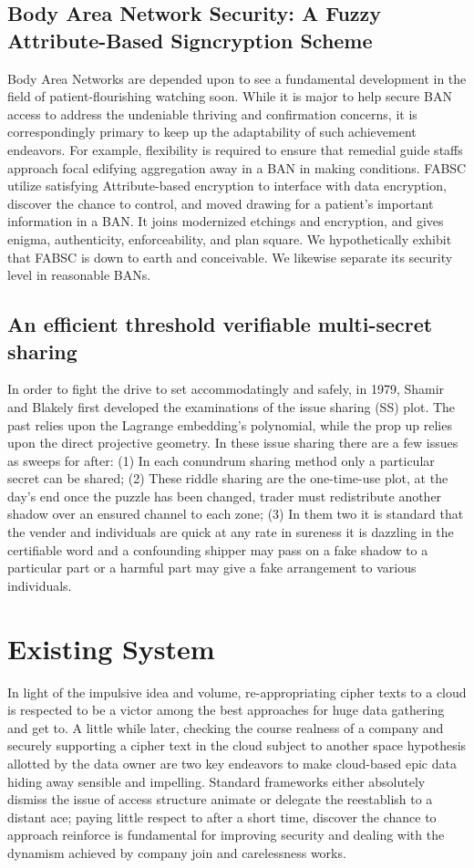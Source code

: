 \documentclass[BTech]{srmuthesis}
\begin{document}
\subsection{Body Area Network Security: A Fuzzy Attribute-Based Signcryption Scheme}
Body Area Networks are depended upon to see a fundamental development in the field of patient-flourishing watching soon. While it is major to help secure BAN access to address the undeniable thriving and confirmation concerns, it is correspondingly primary to keep up the adaptability of such achievement endeavors. For example, flexibility is required to ensure that remedial guide staffs approach focal edifying aggregation away in a BAN in making conditions. FABSC utilize satisfying Attribute-based encryption to interface with data encryption, discover the chance to control, and moved drawing for a patient's important information in a BAN. It joins modernized etchings and encryption, and gives enigma, authenticity, enforceability, and plan square. We hypothetically exhibit that FABSC is down to earth and conceivable. We likewise separate its security level in reasonable BANs.
\subsection{An efficient threshold verifiable multi-secret sharing}
In order to fight the drive to set accommodatingly and safely, in 1979, Shamir and Blakely first developed the examinations of the issue sharing (SS) plot. The past relies upon the Lagrange embedding’s polynomial, while the prop up relies upon the direct projective geometry. In these issue sharing there are a few issues as sweeps for after: (1) In each conundrum sharing method only a particular secret can be shared; (2) These riddle sharing are the one-time-use plot, at the day's end once the puzzle has been changed, trader must redistribute another shadow over an ensured channel to each zone; (3) In them two it is standard that the vender and individuals are quick at any rate in sureness it is dazzling in the certifiable word and a confounding shipper may pass on a fake shadow to a particular part or a harmful part may give a fake arrangement to various individuals.
\section{Existing System}
In light of the impulsive idea and volume, re-appropriating cipher texts to a cloud is respected to be a victor among the best approaches for huge data gathering and get to. A little while later, checking the course realness of a company and securely supporting a cipher text in the cloud subject to another space hypothesis allotted by the data owner are two key endeavors to make cloud-based epic data hiding away sensible and impelling. Standard frameworks either absolutely dismiss the issue of access structure animate or delegate the reestablish to a distant ace; paying little respect to after a short time, discover the chance to approach reinforce is fundamental for improving security and dealing with the dynamism achieved by company join and carelessness works.
\end{document}
